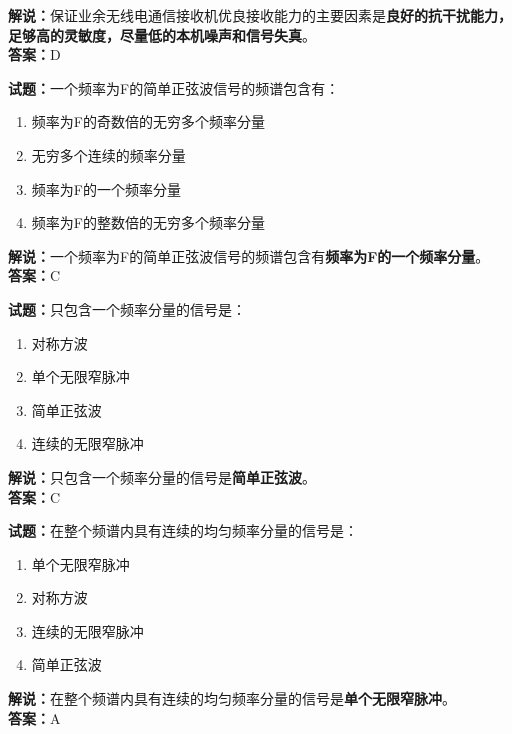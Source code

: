 \documentclass{ctexbook}
\begin{document}
\noindent\textbf{解说：}保证业余无线电通信接收机优良接收能力的主要因素是\textbf{良好的抗干扰能力，足够高的灵敏度，尽量低的本机噪声和信号失真}。\\\noindent\textbf{答案：}D%

\bigskip

\noindent\textbf{试题：}一个频率为F的简单正弦波信号的频谱包含有：

\begin{enumerate}[leftmargin=3em]
  \item 频率为F的奇数倍的无穷多个频率分量
  \item 无穷多个连续的频率分量
  \item 频率为F的一个频率分量
  \item 频率为F的整数倍的无穷多个频率分量
\end{enumerate}

\noindent\textbf{解说：}一个频率为F的简单正弦波信号的频谱包含有\textbf{频率为F的一个频率分量}。\\\noindent\textbf{答案：}C

\bigskip

\noindent\textbf{试题：}只包含一个频率分量的信号是：
\begin{enumerate}[leftmargin=3em]
  \item 对称方波
  \item 单个无限窄脉冲
  \item 简单正弦波
  \item 连续的无限窄脉冲
\end{enumerate}

\noindent\textbf{解说：}只包含一个频率分量的信号是\textbf{简单正弦波}。\\\noindent\textbf{答案：}C

\bigskip

\noindent\textbf{试题：}在整个频谱内具有连续的均匀频率分量的信号是：

\begin{enumerate}[leftmargin=3em]
  \item 单个无限窄脉冲
  \item 对称方波
  \item 连续的无限窄脉冲
  \item 简单正弦波
\end{enumerate}

\noindent\textbf{解说：}在整个频谱内具有连续的均匀频率分量的信号是\textbf{单个无限窄脉冲}。\\\noindent\textbf{答案：}A

\bigskip
\end{document}

